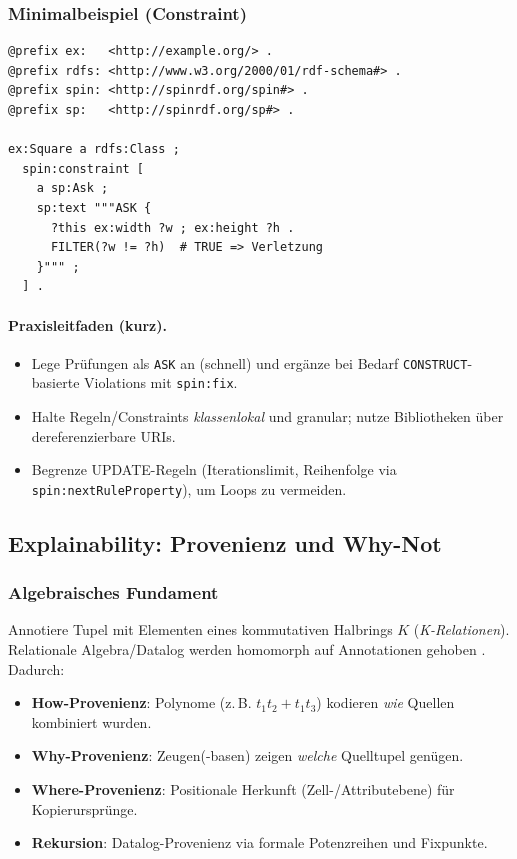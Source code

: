 \subsubsection{Minimalbeispiel (Constraint)}
\begin{lstlisting}[language=turtle,basicstyle=\ttfamily\small,caption={SPIN-Constraint: Quadrat konsistent halten},label={lst:spin-constraint}]
@prefix ex:   <http://example.org/> .
@prefix rdfs: <http://www.w3.org/2000/01/rdf-schema#> .
@prefix spin: <http://spinrdf.org/spin#> .
@prefix sp:   <http://spinrdf.org/sp#> .

ex:Square a rdfs:Class ;
  spin:constraint [
    a sp:Ask ;
    sp:text """ASK {
      ?this ex:width ?w ; ex:height ?h .
      FILTER(?w != ?h)  # TRUE => Verletzung
    }""" ;
  ] .
\end{lstlisting}

\paragraph{Praxisleitfaden (kurz).}
\begin{itemize}
  \item Lege Prüfungen als \texttt{ASK} an (schnell) und ergänze bei Bedarf \texttt{CONSTRUCT}-basierte Violations mit \texttt{spin:fix}.
  \item Halte Regeln/Constraints \emph{klassenlokal} und granular; nutze Bibliotheken über dereferenzierbare URIs.
  \item Begrenze UPDATE-Regeln (Iterationslimit, Reihenfolge via \texttt{spin:nextRuleProperty}), um Loops zu vermeiden.
\end{itemize}

\subsection{Explainability: Provenienz und Why-Not}
\subsubsection{Algebraisches Fundament}
Annotiere Tupel mit Elementen eines kommutativen Halbrings \(K\) (\emph{K-Relationen}). Relationale Algebra/Datalog werden homomorph auf Annotationen gehoben \cite{green-provenance-semirings}. Dadurch:
\begin{itemize}
  \item \textbf{How-Provenienz}: Polynome (z.\,B. \(t_1 t_2 + t_1 t_3\)) kodieren \emph{wie} Quellen kombiniert wurden.
  \item \textbf{Why-Provenienz}: Zeugen(-basen) zeigen \emph{welche} Quelltupel genügen.
  \item \textbf{Where-Provenienz}: Positionale Herkunft (Zell-/Attributebene) für Kopierursprünge.
  \item \textbf{Rekursion}: Datalog-Provenienz via formale Potenzreihen und Fixpunkte.
\end{itemize}

